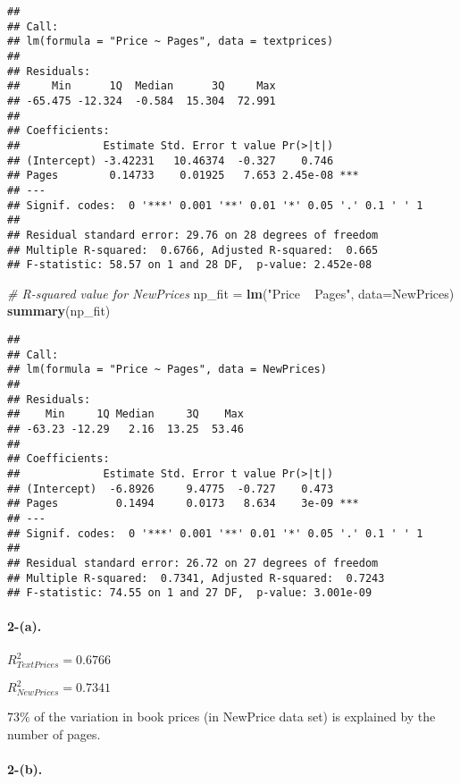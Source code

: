 \documentclass[]{article}
\newenvironment{Shaded}{\begin{snugshade}}{\end{snugshade}}
\newcommand{\KeywordTok}[1]{\textcolor[rgb]{0.13,0.29,0.53}{\textbf{{#1}}}}
\newcommand{\DataTypeTok}[1]{\textcolor[rgb]{0.13,0.29,0.53}{{#1}}}
\newcommand{\StringTok}[1]{\textcolor[rgb]{0.31,0.60,0.02}{{#1}}}
\newcommand{\CommentTok}[1]{\textcolor[rgb]{0.56,0.35,0.01}{\textit{{#1}}}}
\newcommand{\NormalTok}[1]{{#1}}
\let\oldparagraph\paragraph
\renewcommand{\paragraph}[1]{\oldparagraph{#1}\mbox{}}
\begin{document}
\begin{verbatim}
## 
## Call:
## lm(formula = "Price ~ Pages", data = textprices)
## 
## Residuals:
##     Min      1Q  Median      3Q     Max 
## -65.475 -12.324  -0.584  15.304  72.991 
## 
## Coefficients:
##             Estimate Std. Error t value Pr(>|t|)    
## (Intercept) -3.42231   10.46374  -0.327    0.746    
## Pages        0.14733    0.01925   7.653 2.45e-08 ***
## ---
## Signif. codes:  0 '***' 0.001 '**' 0.01 '*' 0.05 '.' 0.1 ' ' 1
## 
## Residual standard error: 29.76 on 28 degrees of freedom
## Multiple R-squared:  0.6766, Adjusted R-squared:  0.665 
## F-statistic: 58.57 on 1 and 28 DF,  p-value: 2.452e-08
\end{verbatim}

\begin{Shaded}
\begin{Highlighting}[]
\CommentTok{# R-squared value for NewPrices}
\NormalTok{np_fit =}\StringTok{ }\KeywordTok{lm}\NormalTok{(}\StringTok{"Price ~ Pages"}\NormalTok{, }\DataTypeTok{data=}\NormalTok{NewPrices)}
\KeywordTok{summary}\NormalTok{(np_fit)}
\end{Highlighting}
\end{Shaded}

\begin{verbatim}
## 
## Call:
## lm(formula = "Price ~ Pages", data = NewPrices)
## 
## Residuals:
##    Min     1Q Median     3Q    Max 
## -63.23 -12.29   2.16  13.25  53.46 
## 
## Coefficients:
##             Estimate Std. Error t value Pr(>|t|)    
## (Intercept)  -6.8926     9.4775  -0.727    0.473    
## Pages         0.1494     0.0173   8.634    3e-09 ***
## ---
## Signif. codes:  0 '***' 0.001 '**' 0.01 '*' 0.05 '.' 0.1 ' ' 1
## 
## Residual standard error: 26.72 on 27 degrees of freedom
## Multiple R-squared:  0.7341, Adjusted R-squared:  0.7243 
## F-statistic: 74.55 on 1 and 27 DF,  p-value: 3.001e-09
\end{verbatim}

\paragraph{2-(a).}\label{a.}

\(R_{TextPrices}^{2} = 0.6766\)

\(R_{NewPrices}^{2} = 0.7341\)

\(73\%\) of the variation in book prices (in NewPrice data set) is
explained by the number of pages.

\paragraph{2-(b).}\label{b.-1}
\end{document}
